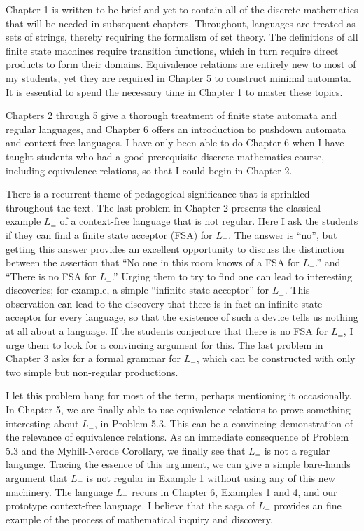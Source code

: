 \documentclass{article}
\begin{document}
Chapter 1 is written to be brief and yet to contain all of the discrete mathematics that will be needed in subsequent chapters. Throughout, languages are treated as sets of strings, thereby requiring the formalism of set theory. The definitions of all finite state machines require transition functions, which in turn require direct products to form their domains. Equivalence relations are entirely new to most of my students, yet they are required in Chapter 5 to construct minimal automata. It is essential to spend the necessary time in Chapter 1 to master these topics.

Chapters 2 through 5 give a thorough treatment of finite state automata and regular languages, and Chapter 6 offers an introduction to pushdown automata and context-free languages. I have only been able to do Chapter 6 when I have taught students who had a good prerequisite discrete mathematics course, including equivalence relations, so that I could begin in Chapter 2.

There is a recurrent theme of pedagogical significance that is sprinkled throughout the text. The last problem in Chapter 2 presents the classical example $L_=$ of a context-free language that is not regular. Here I ask the students if they can find a finite state acceptor (FSA) for $L_=$. The answer is ``no'', but getting this answer provides an excellent opportunity to discuss the distinction between the assertion that ``No one in this room knows of a FSA for $L_=$.'' and ``There is no FSA for $L_=$.'' Urging them to try to find one can lead to interesting discoveries; for example, a simple ``infinite state acceptor'' for $L_=$. This observation can lead to the discovery that there is in fact an infinite state acceptor for every language, so that the existence of such a device tells us nothing at all about a language. If the students conjecture that there is no FSA for $L_=$, I urge them to look for a convincing argument for this. The last problem in Chapter 3 asks for a formal grammar for $L_=$, which can be constructed with only two simple but non-regular productions.

I let this problem hang for most of the term, perhaps mentioning it occasionally. In Chapter 5, we are finally able to use equivalence relations to prove something interesting about $L_=$, in Problem 5.3. This can be a convincing demonstration of the relevance of equivalence relations. As an immediate consequence of Problem 5.3 and the Myhill-Nerode Corollary, we finally see that $L_=$ is not a regular language. Tracing the essence of this argument, we can give a simple bare-hands argument that $L_=$ is not regular in Example 1 without using any of this new machinery. The language $L_=$ recurs in Chapter 6, Examples 1 and 4, and our prototype context-free language. I believe that the saga of $L_=$ provides an fine example of the process of mathematical inquiry and discovery.
\end{document}
